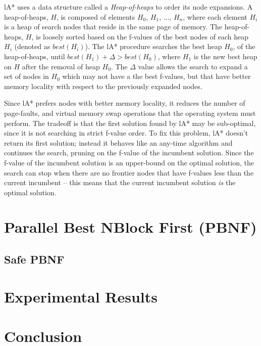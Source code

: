 \documentclass{article} \usepackage{aaai} \usepackage{graphicx}
\begin{document}
lA* uses a data structure called a \emph{Heap-of-heaps} to order its
node expansions.  A heap-of-heaps, $H$, is composed of elements $H_0$,
$H_1$, ..., $H_n$, where each element $H_i$ is a heap of search nodes
that reside in the same page of memory.  The heap-of-heaps, $H$, is
loosely sorted based on the f-values of the best nodes of each heap
$H_i$ (denoted as $best(H_i)$).  The lA* procedure searches the best
heap $H_0$, of the heap-of-heaps, until $best(H_1) + \Delta >
best(H_0)$, where $H_1$ is the new best heap on $H$ after the removal
of heap $H_0$.  The $\Delta$ value allows the search to expand a set
of nodes in $H_0$ which may not have a the best f-values, but that
have better memory locality with respect to the previously expanded
nodes.

Since lA* prefers nodes with better memory locality, it reduces the
number of page-faults, and virtual memory swap operations that the
operating system must perform.  The tradeoff is that the first
solution found by lA* may be sub-optimal, since it is not searching in
strict f-value order.  To fix this problem, lA* doesn't return its
first solution; instead it behaves like an any-time algorithm and
continues the search, pruning on the f-value of the incumbent
solution.  Since the f-value of the incumbent solution is an
upper-bound on the optimal solution, the search can stop when there
are no frontier nodes that have f-values less than the current
incumbent -- this means that the current incumbent solution \emph{is}
the optimal solution.

\section{Parallel Best NBlock First (PBNF)}
\subsection{Safe PBNF}
\section{Experimental Results}
\section{Conclusion}



\end{document}
